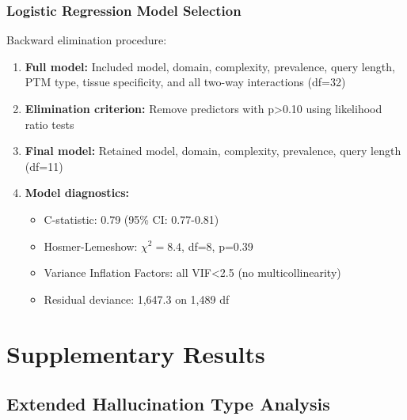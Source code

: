 \documentclass[11pt,a4paper]{article}
\begin{document}
\subsubsection{Logistic Regression Model Selection}

Backward elimination procedure:
\begin{enumerate}
    \item \textbf{Full model:} Included model, domain, complexity, prevalence, query length, PTM type, tissue specificity, and all two-way interactions (df=32)
    \item \textbf{Elimination criterion:} Remove predictors with p>0.10 using likelihood ratio tests
    \item \textbf{Final model:} Retained model, domain, complexity, prevalence, query length (df=11)
    \item \textbf{Model diagnostics:}
    \begin{itemize}
        \item C-statistic: 0.79 (95\% CI: 0.77-0.81)
        \item Hosmer-Lemeshow: $\chi^2=8.4$, df=8, p=0.39
        \item Variance Inflation Factors: all VIF<2.5 (no multicollinearity)
        \item Residual deviance: 1,647.3 on 1,489 df
    \end{itemize}
\end{enumerate}

\section{Supplementary Results}

\subsection{Extended Hallucination Type Analysis}
\end{document}
